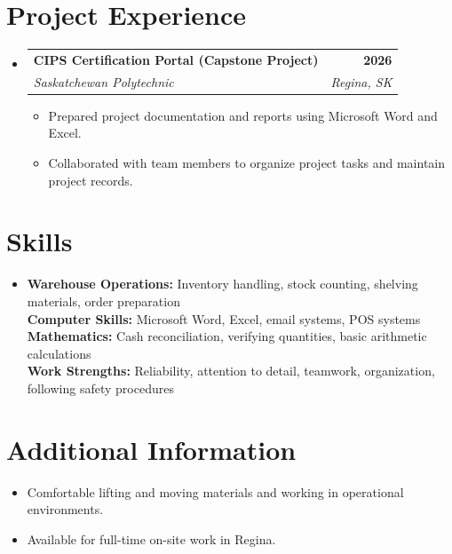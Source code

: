 \documentclass[letterpaper,12pt]{article}
\makeatletter
\newcommand{\resumeItem}[1]{\item #1}
\newcommand{\resumeSubheading}[4]{
\vspace{-2pt}\item
\begin{tabular*}{1.0\textwidth}[t]{l@{\extracolsep{\fill}}r}
\textbf{#1} & \textbf{#2} \\
\textit{#3} & \textit{#4} \\
\end{tabular*}\vspace{-5pt}
}
\newcommand{\resumeSubHeadingListStart}{\begin{itemize}[leftmargin=0in,label={}]}
\newcommand{\resumeSubHeadingListEnd}{\end{itemize}}
\newcommand{\resumeItemListStart}{\begin{itemize}[itemsep=2pt]}
\newcommand{\resumeItemListEnd}{\end{itemize}\vspace{-5pt}}
\makeatother
\begin{document}
\section{Project Experience}

\resumeSubHeadingListStart
\resumeSubheading
{CIPS Certification Portal (Capstone Project)}{2026}
{Saskatchewan Polytechnic}{Regina, SK}
\resumeItemListStart
\resumeItem{Prepared project documentation and reports using Microsoft Word and Excel.}
\resumeItem{Collaborated with team members to organize project tasks and maintain project records.}
\resumeItemListEnd
\resumeSubHeadingListEnd

\section{Skills}

\begin{itemize}[leftmargin=0.15in,label={}]
\item{
\textbf{Warehouse Operations:} Inventory handling, stock counting, shelving materials, order preparation \\
\textbf{Computer Skills:} Microsoft Word, Excel, email systems, POS systems \\
\textbf{Mathematics:} Cash reconciliation, verifying quantities, basic arithmetic calculations \\
\textbf{Work Strengths:} Reliability, attention to detail, teamwork, organization, following safety procedures
}
\end{itemize}

\section{Additional Information}

\resumeSubHeadingListStart
\resumeItem{Comfortable lifting and moving materials and working in operational environments.}
\resumeItem{Available for full-time on-site work in Regina.}
\resumeSubHeadingListEnd
\end{document}
